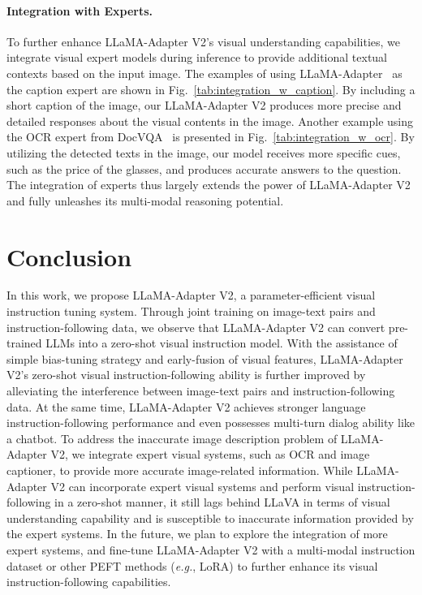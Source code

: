 \documentclass[10pt,twocolumn,letterpaper]{article}
\begin{document}
\paragraph{Integration with Experts.}






To further enhance LLaMA-Adapter V2's visual understanding capabilities, we integrate visual expert models during inference to provide additional textual contexts based on the input image. 
The examples of using LLaMA-Adapter~\cite{llamaadapter2023} as the caption expert are shown in Fig.~\ref{tab:integration_w_caption}. 
By including a short caption of the image, our LLaMA-Adapter V2 produces more precise and detailed responses about the visual contents in the image.
Another example using the OCR expert from DocVQA~\cite{mathew2021docvqa} is presented in Fig.~\ref{tab:integration_w_ocr}. 
By utilizing the detected texts in the image, our model receives more specific cues, such as the price of the glasses, and produces accurate answers to the question. 
The integration of experts thus largely extends the power of LLaMA-Adapter V2 and fully unleashes its multi-modal reasoning potential.


\section{Conclusion}
\label{sec:conclusion}
In this work, we propose LLaMA-Adapter V2, a parameter-efficient visual instruction tuning system.
Through joint training on image-text pairs and instruction-following data, we observe that LLaMA-Adapter V2 can convert pre-trained LLMs into a zero-shot visual instruction model. 
With the assistance of simple bias-tuning strategy and early-fusion of visual features, LLaMA-Adapter V2's zero-shot visual instruction-following ability is further improved by alleviating the interference between image-text pairs and instruction-following data. 
At the same time, LLaMA-Adapter V2 achieves stronger language instruction-following performance and even possesses multi-turn dialog ability like a chatbot.
To address the inaccurate image description problem of LLaMA-Adapter V2, we integrate expert visual systems, such as OCR and image captioner, to provide more accurate image-related information. 
While LLaMA-Adapter V2 can incorporate expert visual systems and perform visual instruction-following in a zero-shot manner, it still lags behind LLaVA in terms of visual understanding capability and is susceptible to inaccurate information provided by the expert systems.
In the future, we plan to explore the integration of more expert systems, and fine-tune LLaMA-Adapter V2 with a multi-modal instruction dataset or other PEFT methods (\emph{e.g.}, LoRA) to further enhance its visual instruction-following capabilities.
\end{document}
